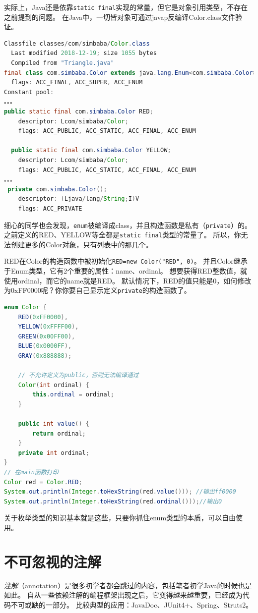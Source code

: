 \noindent
实际上，Java还是依靠\lstinline{static final}实现的常量，但它是对象引用类型，不存在之前提到的问题。
在Java中，一切皆对象可通过javap反编译Color.class文件验证。

\begin{lstlisting}[language=Java,mathescape]
Classfile classes/com/simbaba/Color.class
  Last modified 2018-12-19; size 1055 bytes
  Compiled from "Triangle.java"
final class com.simbaba.Color extends java.lang.Enum<com.simbaba.Color>
  flags: ACC_FINAL, ACC_SUPER, ACC_ENUM
Constant pool:
。。。
public static final com.simbaba.Color RED;
    descriptor: Lcom/simbaba/Color;
    flags: ACC_PUBLIC, ACC_STATIC, ACC_FINAL, ACC_ENUM

  public static final com.simbaba.Color YELLOW;
    descriptor: Lcom/simbaba/Color;
    flags: ACC_PUBLIC, ACC_STATIC, ACC_FINAL, ACC_ENUM
。。。
 private com.simbaba.Color();
    descriptor: (Ljava/lang/String;I)V
    flags: ACC_PRIVATE
\end{lstlisting}

\noindent
细心的同学也会发现，\lstinline{enum}被编译成class，并且构造函数是私有（\lstinline{private}）的。
之前定义的RED、YELLOW等全都是\lstinline{static final}类型的常量了。
所以，你无法创建更多的Color对象，只有列表中的那几个。

RED在Color的构造函数中被初始化\lstinline{RED=new Color("RED", 0)}。
并且Color继承于Enum类型，它有2个重要的属性：name、ordinal。
想要获得RED整数值，就使用ordinal，而它的name就是RED。
默认情况下，RED的值只能是0，如何修改为0xFF0000呢？你你要自己显示定义\lstinline{private}的构造函数了。

\begin{lstlisting}[language=Java,mathescape]
enum Color {
    RED(0xFF0000),
    YELLOW(0xFFFF00),
    GREEN(0x00FF00),
    BLUE(0x0000FF),
    GRAY(0x888888);

    // 不允许定义为public，否则无法编译通过
    Color(int ordinal) {
        this.ordinal = ordinal;
    }

    public int value() {
        return ordinal;
    }
    private int ordinal;
}
// 在main函数打印
Color red = Color.RED;
System.out.println(Integer.toHexString(red.value())); //输出ff0000
System.out.println(Integer.toHexString(red.ordinal()));//输出0
\end{lstlisting}

\noindent
关于枚举类型的知识基本就是这些，只要你抓住enum类型的本质，可以自由使用。


\section{不可忽视的注解}
\emph{注解}（annotation）是很多初学者都会跳过的内容，包括笔者初学Java的时候也是如此。
自从一些依赖注解的编程框架出现之后，它变得越来越重要，已经成为代码不可或缺的一部分。
比较典型的应用：JavaDoc、JUnit4+、Spring、Struts2。

